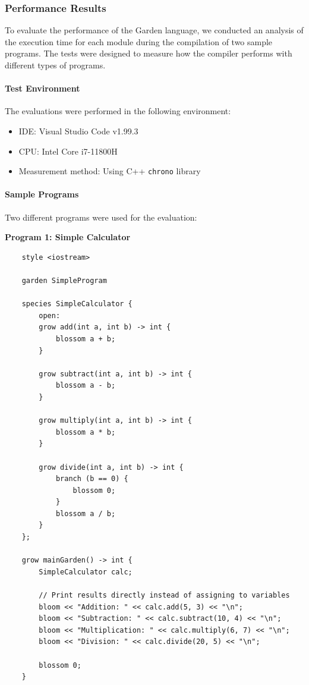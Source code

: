 \documentclass[conference]{IEEEtran}
\begin{document}
\subsubsection{Performance Results}

To evaluate the performance of the Garden language, we conducted an analysis of the execution time for each module during the compilation of two sample programs. The tests were designed to measure how the compiler performs with different types of programs.

\paragraph{Test Environment}
The evaluations were performed in the following environment:
\begin{itemize}
	\item IDE: Visual Studio Code v1.99.3
	\item CPU: Intel Core i7-11800H
	\item Measurement method: Using C++ \texttt{chrono} library
\end{itemize}

\paragraph{Sample Programs}
Two different programs were used for the evaluation:

\textbf{Program 1: Simple Calculator}
\begin{verbatim}
	style <iostream>
	
	garden SimpleProgram
	
	species SimpleCalculator {
		open:
		grow add(int a, int b) -> int {
			blossom a + b;
		}
		
		grow subtract(int a, int b) -> int {
			blossom a - b;
		}
		
		grow multiply(int a, int b) -> int {
			blossom a * b;
		}
		
		grow divide(int a, int b) -> int {
			branch (b == 0) {
				blossom 0;
			}
			blossom a / b;
		}
	};
	
	grow mainGarden() -> int {
		SimpleCalculator calc;
		
		// Print results directly instead of assigning to variables
		bloom << "Addition: " << calc.add(5, 3) << "\n";
		bloom << "Subtraction: " << calc.subtract(10, 4) << "\n";
		bloom << "Multiplication: " << calc.multiply(6, 7) << "\n";
		bloom << "Division: " << calc.divide(20, 5) << "\n";
		
		blossom 0;
	}
\end{verbatim}
\end{document}
